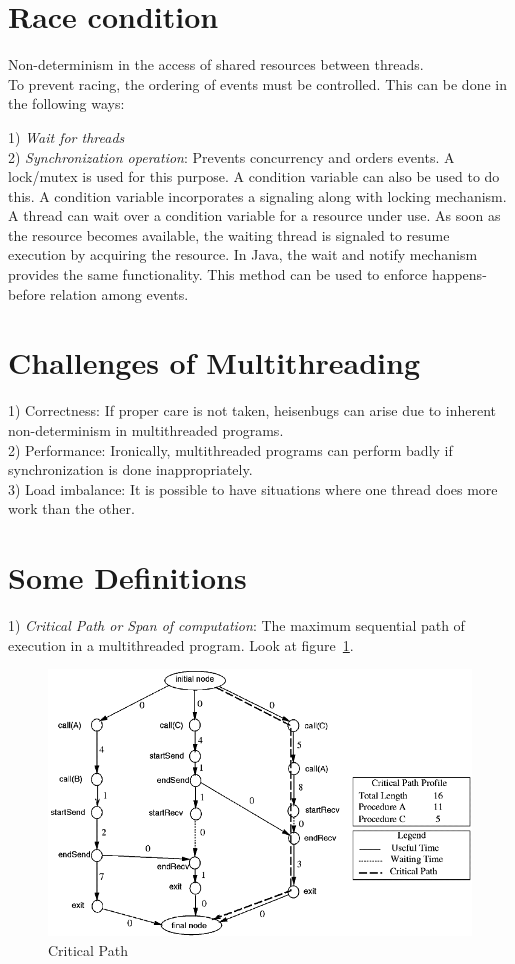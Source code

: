 \documentclass[twoside]{article}
\begin{document}
\section{Race condition} Non-determinism in the access of shared resources between threads. \\
To prevent racing, the ordering of events must be controlled. This can be done in the following ways:

1) \textit{Wait for threads}\\
2) \textit{Synchronization operation}: Prevents concurrency and orders events. A lock/mutex is used for this purpose. A condition variable
can also be used to do this. A condition variable incorporates a signaling along with locking mechanism. A thread can wait over
a condition variable for a resource under use. As soon as the resource becomes available, the waiting thread is signaled to resume
execution by acquiring the resource. In Java, the wait and notify mechanism provides the same functionality. This method can be used
to enforce happens-before relation among events.

\section{Challenges of Multithreading}
1) Correctness: If proper care is not taken, heisenbugs can arise due to inherent non-determinism in multithreaded programs.\\
2) Performance: Ironically, multithreaded programs can perform badly if synchronization is done inappropriately.\\
3) Load imbalance: It is possible to have situations where one thread does more work than the other.

\section{Some Definitions}

1) \textit{Critical Path or Span of computation}: The maximum sequential path of execution in a multithreaded program. Look at figure~\ref{fig:critical_path}.
\begin{figure}[H]
\centering
    \includegraphics[scale=0.5]{critical_path}
    \caption{Critical Path}
    \label{fig:critical_path}
\end{figure}
\end{document}
